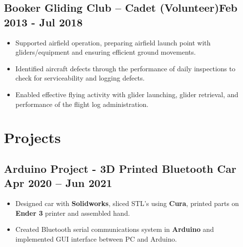 \documentclass[a4paper,9pt]{article}
\begin{document}
\subsection*{\textbf{Booker Gliding Club – Cadet (Volunteer)}\hfill Feb 2013 - Jul 2018}
\begin{itemize}[noitemsep]

	\item Supported airfield operation, preparing airfield launch point with gliders/equipment and ensuring efficient ground movements.
	\item Identified aircraft defects through the performance of daily inspections to check for serviceability and logging defects.
	\item Enabled effective flying activity with glider launching, glider retrieval, and performance of the flight log administration.
\end{itemize}


\section*{Projects}

%
%
%
%

\subsection*{\textbf{Arduino Project - 3D Printed Bluetooth Car } \hfill  Apr 2020 – Jun 2021}
\begin{itemize}[noitemsep]
	\item  Designed car with \textbf{Solidworks}, sliced STL's using \textbf{Cura}, printed parts on \textbf{Ender 3} printer and assembled hand.
	\item  Created Bluetooth serial communications system in \textbf{Arduino} and implemented GUI interface between PC and Arduino.

\end{itemize}
\end{document}
